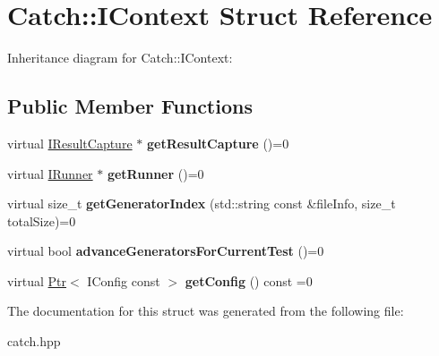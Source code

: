 \hypertarget{struct_catch_1_1_i_context}{}\section{Catch\+:\+:I\+Context Struct Reference}
\label{struct_catch_1_1_i_context}


Inheritance diagram for Catch\+:\+:I\+Context\+:
\subsection*{Public Member Functions}
\begin{DoxyCompactItemize}
\item 
\mbox{\label{struct_catch_1_1_i_context_a684e4ae71d1fdf3060c352ecde1d122f}} 
virtual \hyperlink{struct_catch_1_1_i_result_capture}{I\+Result\+Capture} $\ast$ {\bfseries get\+Result\+Capture} ()=0
\item 
\mbox{\label{struct_catch_1_1_i_context_af088415dde18d039ed5a2f95b02767c6}} 
virtual \hyperlink{struct_catch_1_1_i_runner}{I\+Runner} $\ast$ {\bfseries get\+Runner} ()=0
\item 
\mbox{\label{struct_catch_1_1_i_context_a43e07088db43299ba129fbe6d3106e95}} 
virtual size\+\_\+t {\bfseries get\+Generator\+Index} (std\+::string const \&file\+Info, size\+\_\+t total\+Size)=0
\item 
\mbox{\label{struct_catch_1_1_i_context_a806f7c4ed24d51adae90418e661b24b7}} 
virtual bool {\bfseries advance\+Generators\+For\+Current\+Test} ()=0
\item 
\mbox{\label{struct_catch_1_1_i_context_aee81c415899262e096ad8d6f686fa365}} 
virtual \hyperlink{class_catch_1_1_ptr}{Ptr}$<$ I\+Config const  $>$ {\bfseries get\+Config} () const =0
\end{DoxyCompactItemize}


The documentation for this struct was generated from the following file\+:\begin{DoxyCompactItemize}
\item 
catch.\+hpp\end{DoxyCompactItemize}
